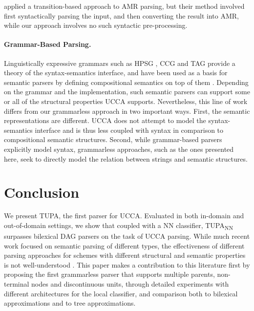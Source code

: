 \documentclass[11pt,a4paper]{article}
\newcommand{\parser}[1]{TUPA\textsubscript{#1}}
\begin{document}
\citet[2016]{wang2015transition} applied a transition-based approach to AMR parsing,
but their method involved first syntactically parsing the input, and then converting
the result into AMR, while our approach involves no such syntactic pre-processing.

\paragraph{Grammar-Based Parsing.}
Linguistically expressive grammars such as HPSG \cite{PandS:94}, CCG \cite{Steedman:00} and TAG \cite{Joshi:97}
provide a theory of the syntax-semantics interface, and have been used as a basis for semantic parsers
by defining compositional semantics on top of them \cite[among others]{Flic:00,bos2005towards}.
Depending on the grammar and the implementation, such semantic parsers can support
some or all of the structural properties UCCA supports.
Nevertheless, this line of work differs from our grammarless approach in two important ways.
First, the semantic representations are different. UCCA does not attempt to model
the syntax-semantics interface and is thus less coupled with syntax in comparison to
compositional semantic structures.
Second, while grammar-based parsers explicitly model syntax, grammarless
approaches, such as the ones presented here, seek to directly model the relation between
strings and semantic structures.


\section{Conclusion}\label{sec:conclusion}
We present \parser{}, the first parser for UCCA.
Evaluated in both in-domain and out-of-domain settings, we show that coupled with a
NN classifier, \parser{NN} surpasses bilexical DAG parsers on the task of UCCA parsing.
While much recent work focused on semantic parsing of different types,
the effectiveness of different parsing approaches for schemes with
different structural and semantic properties is not well-understood 
\cite{kuhlmann2016towards}.
This paper makes a contribution to this literature first by proposing the first grammarless parser that supports multiple parents, non-terminal nodes and discontinuous units, through detailed experiments with different architectures for the local classifier, and comparison both to bilexical approximations and to tree approximations.
\end{document}
